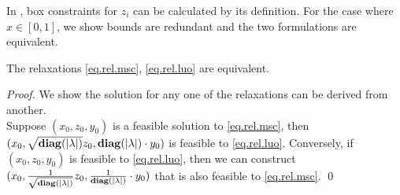 \documentclass[../main]{subfiles}
\begin{document}
In \cite{luo_new_2019}, box constraints for \(z_i\) can be calculated by its definition. For the case where \(x\in [0, 1]\), we show bounds are redundant and the two formulations are equivalent.

\begin{theorem}
  The relaxations \eqref{eq.rel.msc}, \eqref{eq.rel.luo} are equivalent.
\end{theorem}

\begin{proof}
  We show the solution for any one of the relaxations can be derived from another. \\ Suppose $(x_0, z_0, y_0)$ is a feasible solution to \eqref{eq.rel.msc}, then $(x_0, \sqrt{\mathbf{diag}(|\lambda|)} z_0, \mathbf{diag}(|\lambda|) \cdot y_0)$ is feasible to \eqref{eq.rel.luo}. Conversely, if $(x_0, z_0, y_0)$ is feasible to \eqref{eq.rel.luo}, then we can construct $(x_0, \frac{1}{\sqrt{\mathbf{diag}(|\lambda|)}} z_0, \frac{1}{\mathbf{diag}(|\lambda|)}\cdot y_0)$ that is also feasible to \eqref{eq.rel.msc}. \qed
\end{proof}
\end{document}
